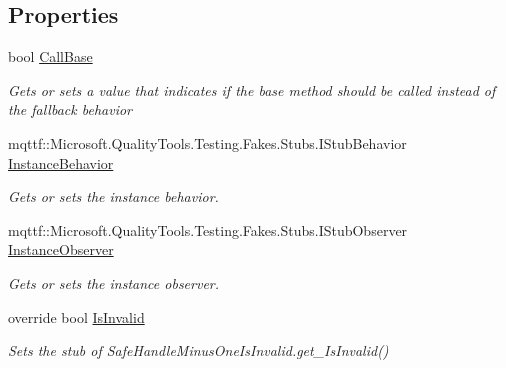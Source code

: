 \subsection*{Properties}
\begin{DoxyCompactItemize}
\item 
bool \hyperlink{class_microsoft_1_1_win32_1_1_safe_handles_1_1_fakes_1_1_stub_safe_handle_minus_one_is_invalid_a9cdde02feee46e688513f85f0b360bff}{Call\-Base}
\begin{DoxyCompactList}\small\item\em Gets or sets a value that indicates if the base method should be called instead of the fallback behavior\end{DoxyCompactList}\item 
mqttf\-::\-Microsoft.\-Quality\-Tools.\-Testing.\-Fakes.\-Stubs.\-I\-Stub\-Behavior \hyperlink{class_microsoft_1_1_win32_1_1_safe_handles_1_1_fakes_1_1_stub_safe_handle_minus_one_is_invalid_a915a0d45a9d34d6aac5a47a2fc04cbcf}{Instance\-Behavior}
\begin{DoxyCompactList}\small\item\em Gets or sets the instance behavior.\end{DoxyCompactList}\item 
mqttf\-::\-Microsoft.\-Quality\-Tools.\-Testing.\-Fakes.\-Stubs.\-I\-Stub\-Observer \hyperlink{class_microsoft_1_1_win32_1_1_safe_handles_1_1_fakes_1_1_stub_safe_handle_minus_one_is_invalid_a5c4b42f36760bb2e4ac0e5114717591e}{Instance\-Observer}
\begin{DoxyCompactList}\small\item\em Gets or sets the instance observer.\end{DoxyCompactList}\item 
override bool \hyperlink{class_microsoft_1_1_win32_1_1_safe_handles_1_1_fakes_1_1_stub_safe_handle_minus_one_is_invalid_a976eb64a1ca377a512ac0a7d74a69915}{Is\-Invalid}
\begin{DoxyCompactList}\small\item\em Sets the stub of Safe\-Handle\-Minus\-One\-Is\-Invalid.\-get\-\_\-\-Is\-Invalid()\end{DoxyCompactList}\end{DoxyCompactItemize}


